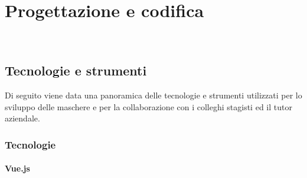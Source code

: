 
\chapter{Progettazione e codifica}
\label{cap:progettazione-codifica}

\\

\section{Tecnologie e strumenti}
\label{sec:tecnologie-strumenti}

Di seguito viene data una panoramica delle tecnologie e strumenti utilizzati per lo sviluppo delle maschere e per la collaborazione con i colleghi stagisti ed il tutor aziendale.

\subsection{Tecnologie}
\label{subsec:tecnologie}

\subsubsection{Vue.js}
\label{subsubsec:vue.js}

